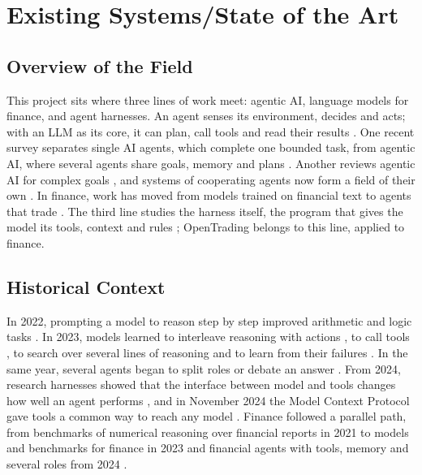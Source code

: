 \chapter{Existing Systems/State of the Art}\label{ch:existing}

\section{Overview of the Field}\label{sec:field}
This project sits where three lines of work meet: agentic AI, language models for finance, and agent harnesses.
An agent senses its environment, decides and acts; with an LLM as its core, it can plan, call tools and read their results \parencite{xi2025rise,wang2024survey}.
One recent survey separates single AI agents, which complete one bounded task, from agentic AI, where several agents share goals, memory and plans \parencite{sapkota2026agents}.
Another reviews agentic AI for complex goals \parencite{acharya2025agentic}, and systems of cooperating agents now form a field of their own \parencite{guo2024multiagent}.
In finance, work has moved from models trained on financial text to agents that trade \parencite{li2023large,ding2026large}.
The third line studies the harness itself, the program that gives the model its tools, context and rules \parencite{yang2024sweagent}; OpenTrading belongs to this line, applied to finance.

\section{Historical Context}\label{sec:history}
In 2022, prompting a model to reason step by step improved arithmetic and logic tasks \parencite{wei2022chain}.
In 2023, models learned to interleave reasoning with actions \parencite{yao2023react}, to call tools \parencite{schick2023toolformer}, to search over several lines of reasoning \parencite{yao2023tree} and to learn from their failures \parencite{shinn2023reflexion}.
In the same year, several agents began to split roles or debate an answer \parencite{hong2024metagpt,wu2024autogen,du2024improving}.
From 2024, research harnesses showed that the interface between model and tools changes how well an agent performs \parencite{yang2024sweagent,wang2025openhands}, and in November 2024 the Model Context Protocol gave tools a common way to reach any model \parencite{anthropic2024introducing}.
Finance followed a parallel path, from benchmarks of numerical reasoning over financial reports in 2021 \parencite{chen2021finqa,zhu2021tatqa} to models and benchmarks for finance in 2023 \parencite{wu2023bloomberggpt,yang2023fingpt,xie2023pixiu,xie2024finben} and financial agents with tools, memory and several roles from 2024 \parencite{zhang2024finagent,yu2024fincon,yang2024finrobot}.

